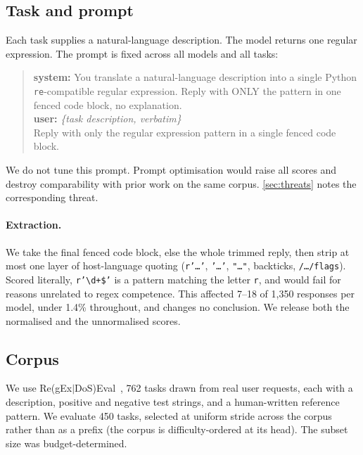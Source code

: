 \documentclass[11pt]{article}
\begin{document}
\subsection{Task and prompt}

Each task supplies a natural-language description. The model returns one
regular expression. The prompt is fixed across all models and all tasks:

\begin{quote}\small
\textbf{system:} You translate a natural-language description into a single
Python \texttt{re}-compatible regular expression. Reply with ONLY the pattern
in one fenced code block, no explanation.\\[0.3em]
\textbf{user:} \textit{\{task description, verbatim\}}\\[0.3em]
Reply with only the regular expression pattern in a single fenced code block.
\end{quote}

We do not tune this prompt. Prompt optimisation would raise all scores and
destroy comparability with prior work on the same corpus. \cref{sec:threats}
notes the corresponding threat.

\paragraph{Extraction.} We take the final fenced code block, else the whole
trimmed reply, then strip at most one layer of host-language quoting
(\texttt{r'\ldots'}, \texttt{'\ldots'}, \texttt{"\ldots"}, backticks,
\texttt{/\ldots/flags}). Scored literally, \texttt{r'\textbackslash d+\$'} is
a pattern matching the letter \texttt{r}, and would fail for reasons
unrelated to regex competence. This affected 7--18 of 1{,}350 responses per
model, under 1.4\% throughout, and changes no conclusion. We release both the
normalised and the unnormalised scores.

\subsection{Corpus}

We use Re(gEx$|$DoS)Eval~\citep{siddiq2024regexeval}, 762 tasks drawn from real user
requests, each with a description, positive and negative test strings, and a
human-written reference pattern. We evaluate 450 tasks, selected at uniform
stride across the corpus rather than as a prefix (the corpus is
difficulty-ordered at its head). The subset size was budget-determined.
\end{document}
